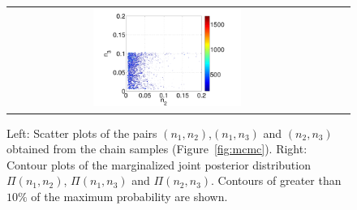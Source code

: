 \documentclass[review,12pt]{elsarticle}
\begin{document}
\begin{figure}[ht]
\begin{tabular}{clc}
\includegraphics[width=0.475\textwidth]{Figure16f.pdf}
        \end{tabular}
\caption{Left: Scatter plots of the pairs $(n_1,n_2)$,$(n_1,n_3)$ and $(n_2,n_3)$ obtained from the
chain samples (Figure~\ref{fig:mcmc}). 
Right: Contour plots of the marginalized joint posterior distribution $\Pi(n_1,n_2)$, $\Pi(n_1,n_3)$ and $\Pi(n_2,n_3)$.  Contours of greater than $10\%$ of the maximum probability are shown.}
\label{fig:joint} 
        \end{figure}
\end{document}
